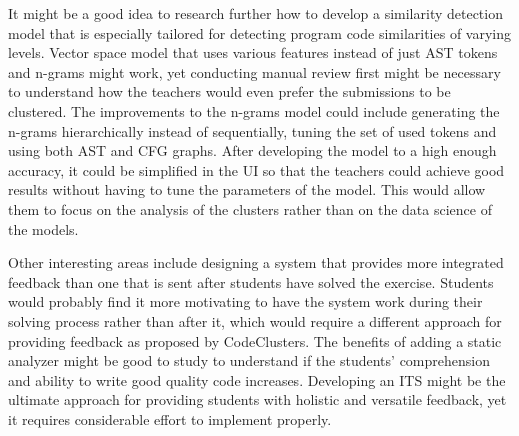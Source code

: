 It might be a good idea to research further how to develop a similarity detection model that is especially tailored for detecting program code similarities of varying levels. Vector space model that uses various features instead of just AST tokens and n-grams might work, yet conducting manual review first might be necessary to understand how the teachers would even prefer the submissions to be clustered. The improvements to the n-grams model could include generating the n-grams hierarchically instead of sequentially, tuning the set of used tokens and using both AST and CFG graphs. After developing the model to a high enough accuracy, it could be simplified in the UI so that the teachers could achieve good results without having to tune the parameters of the model. This would allow them to focus on the analysis of the clusters rather than on the data science of the models.

Other interesting areas include designing a system that provides more integrated feedback than one that is sent after students have solved the exercise. Students would probably find it more motivating to have the system work during their solving process rather than after it, which would require a different approach for providing feedback as proposed by CodeClusters. The benefits of adding a static analyzer might be good to study to understand if the students' comprehension and ability to write good quality code increases. Developing an ITS might be the ultimate approach for providing students with holistic and versatile feedback, yet it requires considerable effort to implement properly.
